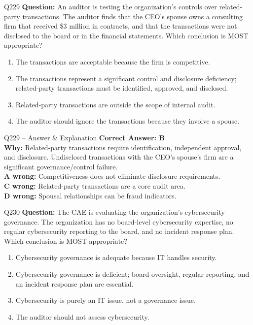 \documentclass[aspectratio=169,10pt]{beamer}
\begin{document}
	\begin{frame}[t]{Q229}
		\small
		\textbf{Question:} An auditor is testing the organization's controls over related-party transactions. The auditor finds that the CEO's spouse owns a consulting firm that received \$3 million in contracts, and that the transactions were not disclosed to the board or in the financial statements. Which conclusion is MOST appropriate?
		\begin{enumerate}[label=\Alph*.,itemsep=1pt,topsep=2pt]
			\item The transactions are acceptable because the firm is competitive.
			\item The transactions represent a significant control and disclosure deficiency; related-party transactions must be identified, approved, and disclosed.
			\item Related-party transactions are outside the scope of internal audit.
			\item The auditor should ignore the transactions because they involve a spouse.
		\end{enumerate}
	\end{frame}
	
	\begin{frame}[t]{Q229 -- Answer \& Explanation}
		\small
		\textbf{Correct Answer: B} \\[4pt]
		\textbf{Why:} Related-party transactions require identification, independent approval, and disclosure. Undisclosed transactions with the CEO's spouse's firm are a significant governance/control failure. \\[4pt]
		\textbf{A wrong:} Competitiveness does not eliminate disclosure requirements. \\[2pt]
		\textbf{C wrong:} Related-party transactions are a core audit area. \\[2pt]
		\textbf{D wrong:} Spousal relationships can be fraud indicators.
	\end{frame}
	
	\begin{frame}[t]{Q230}
		\small
		\textbf{Question:} The CAE is evaluating the organization's cybersecurity governance. The organization has no board-level cybersecurity expertise, no regular cybersecurity reporting to the board, and no incident response plan. Which conclusion is MOST appropriate?
		\begin{enumerate}[label=\Alph*.,itemsep=1pt,topsep=2pt]
			\item Cybersecurity governance is adequate because IT handles security.
			\item Cybersecurity governance is deficient; board oversight, regular reporting, and an incident response plan are essential.
			\item Cybersecurity is purely an IT issue, not a governance issue.
			\item The auditor should not assess cybersecurity.
		\end{enumerate}
	\end{frame}
	
\end{document}
